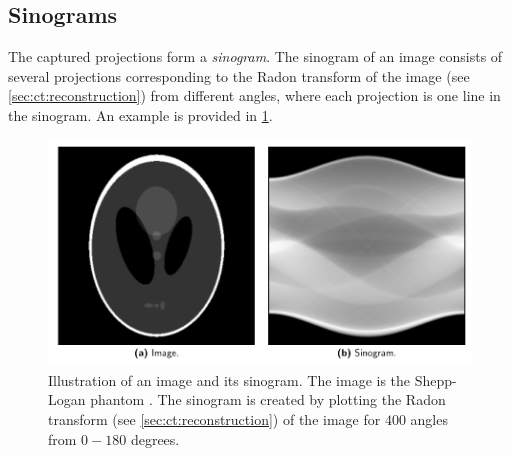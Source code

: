 \subsection{Sinograms}
\label{sec:ct:imagingmethod:sinograms}
The captured projections form a \textit{sinogram}. The sinogram of an image consists of several projections corresponding to the Radon transform of the image (see \cref{sec:ct:reconstruction}) from different angles, where each projection is one line in the sinogram. An example is provided in \cref{fig:sinogramshepplogan}. 
\begin{figure}[htbp]  
    \centering
    \includegraphics[width=.9\textwidth]{figures/sinogramshepplogan.pdf}
    \caption[Illustration of an image and a corresponding sinogram]{Illustration of an image and its sinogram. The image is the Shepp-Logan phantom \cite{6499235}. The sinogram is created by plotting the Radon transform (see \cref{sec:ct:reconstruction}) of the image for $400$ angles from $0-180$ degrees. }
    \label{fig:sinogramshepplogan}
\end{figure}

